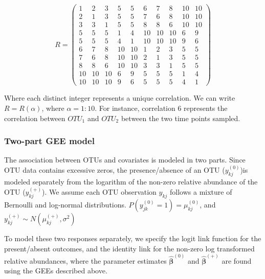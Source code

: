\documentclass[12pt]{article}
\begin{document}
\begin{singlespace}
$$R = \begin{pmatrix}
        1 & 2 & 3 & 5 & 5 &  6 & 7 & 8 & 10 & 10 \\
        2 & 1 & 3 & 5 & 5 & 7 & 6 & 8 & 10 & 10 \\
        3 & 3 & 1 & 5 & 5 & 8 & 8 & 6 & 10 & 10 \\
        5 & 5 & 5 & 1 & 4 & 10 & 10 & 10 & 6 & 9 \\
        5 & 5 & 5 & 4 & 1 & 10 & 10 & 10  & 9 & 6 \\
        6 & 7 & 8 & 10 & 10 & 1 & 2 & 3 & 5 & 5  \\
        7 & 6 & 8 & 10 & 10 & 2 & 1 & 3 & 5 & 5  \\
        8 & 8 & 6 & 10 & 10 & 3 & 3 & 1 & 5 & 5 \\
        10 & 10 & 10 & 6 & 9 & 5 & 5 & 5 & 1 & 4  \\
        10 & 10 & 10  & 9 & 6  & 5 & 5 & 5 & 4 & 1
  \end{pmatrix}$$
\end{singlespace}
Where each distinct integer represents a unique correlation. We can write $R = R(\alpha)$, where $\alpha = 1:10$. For instance, correlation 6 represents the correlation between $OTU_1$ and $OTU_2$ between the two time points sampled.

\subsubsection{Two-part GEE model}

The association between OTUs and covariates is modeled in two parts. Since OTU data contains excessive zeros, the presence/absence of an OTU ($y_{kj}^{(0)}$)is modeled separately from the logarithm of the non-zero relative abundance of the OTU ($y_{kj}^{(+)}$). We assume each OTU observation $y_{kj}$ follows a mixture of Bernoulli and log-normal distributions. $P(y_{jk}^{(0)} = 1) = \mu_{kj}^{(0)}$, and $y_{kj}^{(+)} \sim N(\mu_{kj}^{(+)}, \sigma^2)$

%
%

To model these two responses separately, we specify the logit link function for the present/absent outcomes, and the identity link for the non-zero log transformed relative abundances, where the parameter estimates $\hat{\boldsymbol\beta}^{(0)}$ and $\hat{\boldsymbol\beta}^{(+)}$ are found using the GEEs described above.
\end{document}
